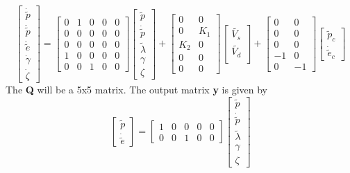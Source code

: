 \[
\begin{bmatrix}
    \dot{\tilde p} \\
    \ddot{\tilde{p}}\\
    \ddot{\tilde e}\\ 
    \dot{\gamma}\\
    \dot{\zeta}
\end{bmatrix}
=
\begin{bmatrix}
    0 & 1  & 0 & 0 & 0\\
    0 & 0  & 0 & 0 & 0\\
    0 & 0  & 0 & 0 & 0\\
    1 & 0  & 0 & 0 & 0\\
    0 & 0  & 1 & 0 & 0
\end{bmatrix}
\begin{bmatrix}
    \tilde {p} \\
    \dot{\tilde{p}}\\
    \tilde{\lambda}\\
    \gamma\\
    \zeta
 \end{bmatrix}
 + 
 \begin{bmatrix}
    0 & 0 \\
    0 & K_1 \\
    K_2 & 0 \\
    0 & 0\\ 
    0 & 0
\end{bmatrix}
\begin{bmatrix}
    \tilde{V_s}\\
    \tilde{V_d}\\ 
\end{bmatrix}
+
 \begin{bmatrix}
    0 & 0 \\
    0 & 0 \\
    0 & 0 \\
    -1 & 0\\ 
    0 & -1
\end{bmatrix}
\begin{bmatrix}
    \tilde{p}_c\\
    \dot{\tilde{e}}_c
\end{bmatrix}
\]
The \textbf{Q} will be a 5x5 matrix. The output matrix \textbf{y} is given by 
\[
    \begin{bmatrix}
    \tilde{p}\\
    \dot{\tilde{e}}
    \end{bmatrix}
=
    \begin{bmatrix}
    1 & 0 & 0 & 0 & 0 \\
    0 & 0 & 1 & 0 & 0
    \end{bmatrix}
 \begin{bmatrix}
    \tilde {p} \\
    \dot{\tilde{p}}\\
    \tilde{\lambda}\\
    \gamma\\
    \zeta
 \end{bmatrix}
\]
